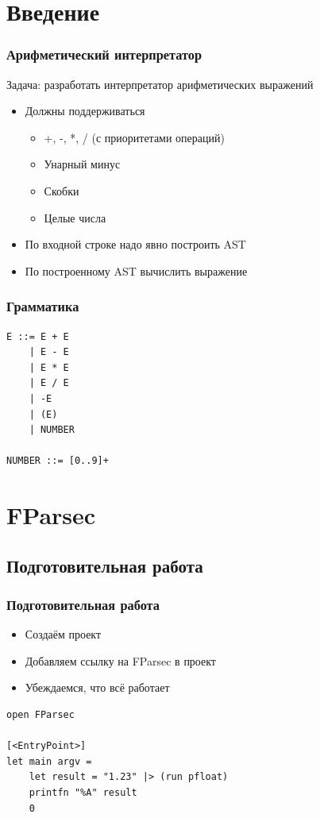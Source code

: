 \documentclass{../../slides-style}
\begin{document}
    
    \frame{\titlepage}

    \section{Введение}
    
    \begin{frame}
        \frametitle{Арифметический интерпретатор}
        Задача: разработать интерпретатор арифметических выражений
        \begin{itemize}
            \item Должны поддерживаться 
            \begin{itemize}
                \item +, -, *, / (с приоритетами операций)
                \item Унарный минус
                \item Скобки
                \item Целые числа
            \end{itemize}
            \item По входной строке надо явно построить AST
            \item По построенному AST вычислить выражение
        \end{itemize}
    \end{frame}

    \begin{frame}[fragile]
        \frametitle{Грамматика}
        \begin{verbatim}
E ::= E + E
    | E - E
    | E * E
    | E / E
    | -E
    | (E)
    | NUMBER

NUMBER ::= [0..9]+
        \end{verbatim}
    \end{frame}

    \section{FParsec}

    \subsection{Подготовительная работа}

    \begin{frame}[fragile]
        \frametitle{Подготовительная работа}
        \begin{itemize}
            \item Создаём проект
            \item Добавляем ссылку на FParsec в проект
            \item Убеждаемся, что всё работает
        \end{itemize}
        \begin{verbatim}
open FParsec

[<EntryPoint>]
let main argv =
    let result = "1.23" |> (run pfloat)
    printfn "%A" result
    0 
        \end{verbatim}
    \end{frame}
\end{document}
